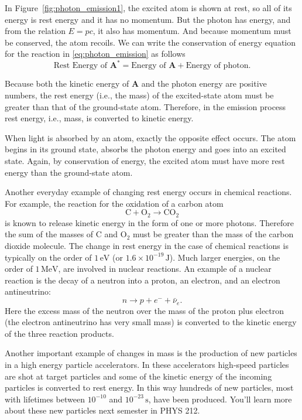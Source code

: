 In Figure~\ref{fig:photon_emission1}, the excited atom is shown at rest,
so all of its energy is rest energy and it has no momentum.  But the
photon has energy, and from the relation $E = pc$, it also has
momentum.  And because momentum must be conserved, the atom recoils.
We can write the conservation of energy equation for the reaction in
\eqref{eq:photon_emission} as follows
\begin{equation}
\text{Rest Energy of $\textbf{A}^\ast$} = \text{Energy of $\textbf{A}$} 
+ \text{Energy of photon}.
\end{equation}
     
Because both the kinetic energy of $\textbf{A}$ and the photon energy are
positive numbers, the rest energy (i.e., the mass) of the
excited-state atom must be greater than that of the ground-state atom.
Therefore, in the emission process rest energy, i.e., mass, is
converted to kinetic energy.
     
When light is absorbed by an atom, exactly the opposite effect occurs.
The atom begins in its ground state, absorbs the photon energy and
goes into an excited state.  Again, by conservation of energy, the
excited atom must have more rest energy than the ground-state atom.

Another everyday example of changing rest energy occurs in chemical
reactions.  For example, the reaction for the oxidation of a carbon
atom
\begin{equation}
\text{C} + \text{O}_2 \rightarrow \text{CO}_2
\end{equation}
is known to release kinetic energy in the form of one or more photons.
Therefore the sum of the masses of C and O$_2$ must be greater than
the mass of the carbon dioxide molecule.  The change in rest energy in
the case of chemical reactions is typically on the order of
$1\,\text{eV}$ (or $1.6\times 10^{-19}\,\text{J}$).  Much larger
energies, on the order of $1\,\text{MeV}$, are involved in nuclear
reactions.  An example of a nuclear reaction is the decay of a neutron
into a proton, an electron, and an electron antineutrino:
\begin{equation}
n \rightarrow p + e^- + \bar{\nu}_e.
\end{equation}
Here the excess mass of the neutron over the mass of the proton plus
electron (the electron antineutrino has very small mass) is converted
to the kinetic energy of the three reaction products.

Another important example of changes in mass is the production of
new particles in a high energy particle accelerators.  In these
accelerators high-speed particles are shot at target particles and
some of the kinetic energy of the incoming particles is converted to
rest energy.  In this way hundreds of new particles, most with
lifetimes between $10^{-10}$ and $10^{-23}\,\text{s}$, have been
produced.  You'll learn more about these new particles next semester
in PHYS 212.

